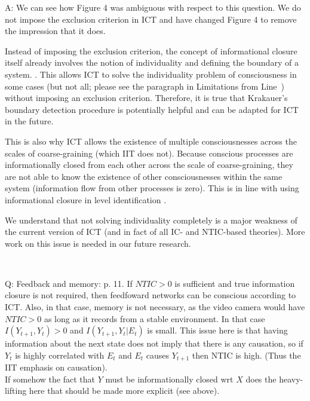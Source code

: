 \documentclass[utf8]{article}
\newcounter{cQuestion}[section]
\newenvironment{question}
    {\refstepcounter{cQuestion}\color{Blue}\noindent\newline Q\thecQuestion:}
    {~\newline}
\newenvironment{ans}  
    {\color{Black}\noindent A:}
    {~\newline}
\begin{document}
    	\begin{ans}
            We can see how Figure 4 was ambiguous with respect to this question. We do not impose the exclusion criterion in ICT and have changed Figure 4 to remove the impression that it does. 
            
            Instead of imposing the exclusion criterion, the concept of informational closure itself already involves the notion of individuality and defining the boundary of a system. \citep{BERTSCHINGER.2006}. This allows ICT to solve the individuality problem of consciousness in some cases (but not all; please see the paragraph in Limitations from Line~) without imposing an exclusion criterion. Therefore, it is true that Krakauer's boundary detection procedure is potentially helpful and can be adapted for ICT in the future. 
            
            This is also why ICT allows the existence of multiple consciousnesses across the scales of coarse-graining (which IIT does not). Because conscious processes are informationally closed from each other across the scale of coarse-graining, they are not able to know the existence of other consciousnesses within the same system (information flow from other processes is zero). This is in line with using informational closure in level identification \citep{PFANTE.2014}.
            
            We understand that not solving individuality completely is a major weakness of the current version of ICT (and in fact of all IC- and NTIC-based theories). More work on this issue is needed in our future research.
            
    	\end{ans}

        \begin{question}
            Feedback and memory: p. 11. If $NTIC > 0$ is sufficient and true information closure is not required, then feedfoward networks can be conscious according to ICT. Also, in that case, memory is not necessary, as the video camera would have $NTIC > 0$ as long as it records from a stable environment. In that case $I(Y_{t+1}, Y_t) > 0$ and $I(Y_{t+1}, Y_t|E_t)$ is small. This issue here is that having information about the next state does not imply that there is any causation, so if $Y_t$ is highly correlated with $E_t$ and $E_t$ causes $Y_{t+1}$ then NTIC is high. (Thus the IIT emphasis on causation).\\
            If somehow the fact that $Y$ must be informationally closed wrt $X$ does the heavy-lifting here that should be made more explicit (see above).
        \end{question}
        
\end{document}
